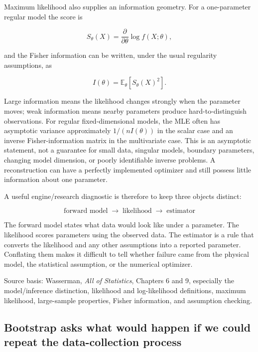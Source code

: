 Maximum likelihood also supplies an information geometry. For a one-parameter regular model the score is

\[
S_\theta(X)=\frac{\partial}{\partial\theta}\log f(X;\theta),
\]

and the Fisher information can be written, under the usual regularity assumptions, as

\[
I(\theta)=
\mathbb E_\theta[S_\theta(X)^2].
\]

Large information means the likelihood changes strongly when the parameter moves; weak information means nearby parameters produce hard-to-distinguish observations. For regular fixed-dimensional models, the MLE often has asymptotic variance approximately \(1/(nI(\theta))\) in the scalar case and an inverse Fisher-information matrix in the multivariate case. This is an asymptotic statement, not a guarantee for small data, singular models, boundary parameters, changing model dimension, or poorly identifiable inverse problems. A reconstruction can have a perfectly implemented optimizer and still possess little information about one parameter.

A useful engine/research diagnostic is therefore to keep three objects distinct:

\[
\boxed{
\text{forward model}
\;\longrightarrow\;
\text{likelihood}
\;\longrightarrow\;
\text{estimator}
}
\]

The forward model states what data would look like under a parameter. The likelihood scores parameters using the observed data. The estimator is a rule that converts the likelihood and any other assumptions into a reported parameter. Conflating them makes it difficult to tell whether failure came from the physical model, the statistical assumption, or the numerical optimizer.

Source basis: Wasserman, \emph{All of Statistics}, Chapters 6 and 9, especially the model/inference distinction, likelihood and log-likelihood definitions, maximum likelihood, large-sample properties, Fisher information, and assumption checking.

\subsection{Bootstrap asks what would happen if we could repeat the data-collection process}\label{02-foundations-ii-ch030-bootstrap-asks-what-would-happen-if-we-could-repeat-the-data-collection-process}

\hypertarget{02-foundations-ii-ch030-bootstrap-asks-what-would-happen-if-we-could-repeat-the-data-collection-process}{}

